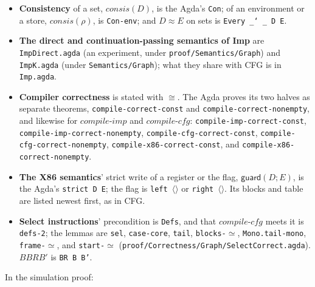 \documentclass[10pt]{article}
\theoremstyle{acmplain}
\newcommand{\key}[1]{\mathsf{#1}}
\newcommand{\pass}[1]{\mathit{#1}}
\newcommand{\emptytup}{\langle\rangle}
\newcommand{\consis}{\mathit{consis}}
\newcommand{\obseq}{\cong}
\begin{document}
\begin{itemize}
  in the Agda, newest first: block $t_l$ is the one with $l$ blocks after
  it in the list, and is looked up with the blocks older than it
  (\texttt{block}). So a list that extends $\vec{t}$ with newer blocks
  ($\vec{t} \preceq \vec{t}'$, $\vec{t} \sqsubseteq \vec{t}'$) has $\vec{t}$
  as a suffix in the Agda, not a prefix.
\item \textbf{Consistency} of a set, $\consis(D)$, is the Agda's \texttt{Con};
  of an environment or a store, $\consis(\rho)$, is \texttt{Con-env}; and
  $D \approx E$ on sets is \texttt{Every \_\char`~\_ D E}.
\item \begin{sloppypar}\textbf{The direct and continuation-passing semantics of Imp} are
  \texttt{ImpDirect.agda} (an experiment, under
  \texttt{proof/Semantics/Graph}) and \texttt{ImpK.agda} (under
  \texttt{Semantics/Graph}); what they share with CFG is in
  \texttt{Imp.agda}.\end{sloppypar}
\item \begin{sloppypar}\textbf{Compiler correctness} is stated with $\obseq$.
  The Agda proves its two halves as separate theorems,
  \texttt{compile-correct-const} and \texttt{compile-correct-nonempty},
  and likewise for $\pass{compile\text{-}imp}$ and $\pass{compile\text{-}cfg}$:
  \texttt{compile-imp-correct-const}, \texttt{compile-imp-correct-nonempty},
  \texttt{compile-cfg-correct-const},
  \texttt{compile-cfg-correct-nonempty}, \texttt{compile-x86-correct-const},
  and \texttt{compile-x86-correct-nonempty}.\end{sloppypar}
\item \textbf{The X86 semantics}' strict write of a register or the flag,
  $\key{guard}(D; E)$, is the Agda's \texttt{strict D E}; the flag is
  \texttt{left}~$\emptytup$ or \texttt{right}~$\emptytup$. Its blocks and
  table are listed newest first, as in CFG.
\item \begin{sloppypar}\textbf{Select instructions}' precondition is \texttt{Defs}, and
  that $\pass{compile\text{-}cfg}$ meets it is \texttt{defs-2}; the
  lemmas are \texttt{sel}, \texttt{case-core}, \texttt{tail},
  \texttt{blocks-}$\simeq$, \texttt{Mono.tail-mono}, \texttt{frame-}$\simeq$,
  and \texttt{start-}$\simeq$ (\texttt{proof/Correctness/Graph/SelectCorrect.agda}).
  $B \mathrel{\mathit{BR}} B'$ is \texttt{BR B B'}.\end{sloppypar}
\end{itemize}
In the simulation proof:
\end{document}
